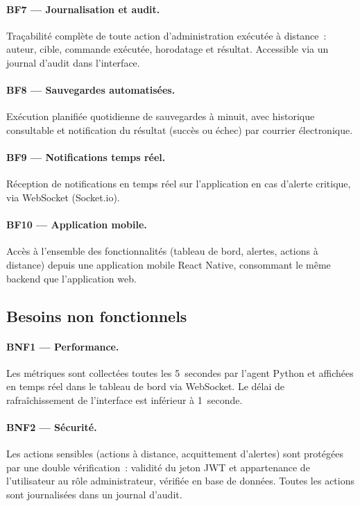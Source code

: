 \paragraph{BF7 --- Journalisation et audit.} Traçabilité complète de toute action d'administration exécutée à distance~: auteur, cible, commande exécutée, horodatage et résultat. Accessible via un journal d'audit dans l'interface.

\paragraph{BF8 --- Sauvegardes automatisées.} Exécution planifiée quotidienne de sauvegardes à minuit, avec historique consultable et notification du résultat (succès ou échec) par courrier électronique.

\paragraph{BF9 --- Notifications temps réel.} Réception de notifications en temps réel sur l'application en cas d'alerte critique, via WebSocket (Socket.io).

\paragraph{BF10 --- Application mobile.} Accès à l'ensemble des fonctionnalités (tableau de bord, alertes, actions à distance) depuis une application mobile React Native, consommant le même backend que l'application web.

\subsection{Besoins non fonctionnels}

\paragraph{BNF1 --- Performance.} Les métriques sont collectées toutes les 5~secondes par l'agent Python et affichées en temps réel dans le tableau de bord via WebSocket. Le délai de rafraîchissement de l'interface est inférieur à 1~seconde.

\paragraph{BNF2 --- Sécurité.} Les actions sensibles (actions à distance, acquittement d'alertes) sont protégées par une double vérification~: validité du jeton JWT et appartenance de l'utilisateur au rôle administrateur, vérifiée en base de données. Toutes les actions sont journalisées dans un journal d'audit.

